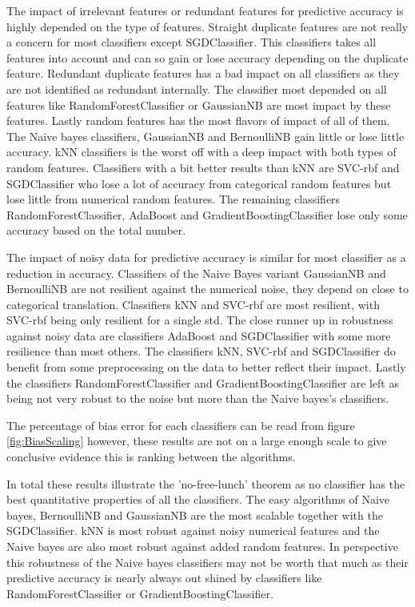 \documentclass[a4paper,10pt]{article}
\begin{document}
The impact of irrelevant features or redundant features for predictive accuracy is highly depended on the type of features. Straight duplicate features are not really a concern for most classifiers except SGDClassifier. This classifiers takes all features into account and can so gain or lose accuracy depending on the duplicate feature. Redundant duplicate features has a bad impact on all classifiers as they are not identified as redundant internally. The classifier most depended on all features like RandomForestClassifier or GaussianNB are most impact by these features. Lastly random features has the most flavors of impact of all of them. The Naive bayes classifiers, GaussianNB and BernoulliNB gain little or lose little accuracy. kNN classifiers is the worst off with a deep impact with both types of random features. Classifiers with a bit better results than kNN are SVC-rbf and SGDClassifier who lose a lot of accuracy from categorical random features but lose little from numerical random features. The remaining classifiers RandomForestClassifier, AdaBoost and GradientBoostingClassifier lose only some accuracy based on the total number.

The impact of noisy data for predictive accuracy is similar for most classifier as a reduction in accuracy. Classifiers of the Naive Bayes variant GaussianNB and BernoulliNB are not resilient against the numerical noise, they depend on close to categorical translation. Classifiers kNN and SVC-rbf are most resilient, with SVC-rbf being only resilient for a single std. The close runner up in robustness against noisy data are classifiers AdaBoost and SGDClassifier with some more resilience than most others. The classifiers kNN, SVC-rbf and SGDClassifier do benefit from some preprocessing on the data to better reflect their impact. Lastly the classifiers RandomForestClassifier and GradientBoostingClassifier are left as being not very robust to the noise but more than the Naive bayes's classifiers. 

The percentage of bias error for each classifiers can be read from figure \ref{fig:BiasScaling} however, these results are not on a large enough scale to give conclusive evidence this is ranking between the algorithms.

In total these results illustrate the 'no-free-lunch' theorem as no classifier has the best quantitative properties of all the classifiers. The easy algorithms of Naive bayes, BernoulliNB and GaussianNB are the most scalable together with the SGDClassifier. kNN is most robust against noisy numerical features and the Naive bayes are also most robust against added random features. In perspective this robustness of the Naive bayes classifiers may not be worth that much as their predictive accuracy is nearly always out shined by classifiers like RandomForestClassifier or GradientBoostingClassifier.
\end{document}
